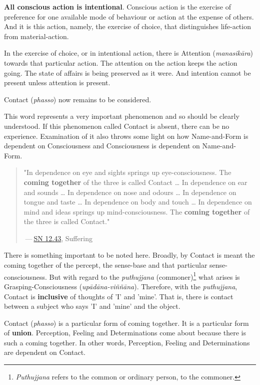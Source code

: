 \textbf{All conscious action is intentional}. Conscious action is the
exercise of preference for one available mode of behaviour or action at
the expense of others. And it is this action, namely, the exercise of
choice, that distinguishes life-action from material-action.


In the exercise of choice, or in intentional action, there is Attention
(\emph{manasikāra}) towards that particular action. The attention on the
action keeps the action going. The state of affairs is being preserved
as it were. And intention cannot be present unless attention is present.


Contact (\emph{phasso}) now remains to be considered.


This word represents a very important phenomenon and so should be
clearly understood. If this phenomenon called Contact is absent, there
can be no experience. Examination of it also throws some light on how
Name-and-Form is dependent on Consciousness and Consciousness is
dependent on Name-and- Form.


\begin{quotation}
"In dependence on eye and sights springs up eye-consciousness. The
\textbf{coming together} of the three is called Contact … In dependence on ear
and sounds … In dependence on nose and odours … In dependence on tongue
and taste … In dependence on body and touch … In dependence on mind and
ideas springs up mind-consciousness. The \textbf{coming together} of the three
is called Contact."


 — \href{https://suttacentral.net/sn12.43/en/bodhi}{SN 12.43}, Suffering


\end{quotation}

There is something important to be noted here. Broadly, by Contact is
meant the coming together of the percept, the sense-base and that
particular sense-consciousness. But with regard to the \emph{puthujjana}
(commoner)\footnote{\emph{Puthujjana} refers to the common or ordinary person, to the commoner.}
what arises is Grasping-Consciousness
(\emph{upādāna-viññāna}). Therefore, with the \emph{puthujjana}, Contact is
\textbf{inclusive} of thoughts of 'I' and 'mine'. That is, there is contact
between a subject who says 'I' and 'mine' and the object.


Contact (\emph{phasso}) is a particular form of coming together. It is a
particular form of \textbf{union}. Perception, Feeling and Determinations
come about because there is such a coming together. In other words,
Perception, Feeling and Determinations are dependent on Contact.


